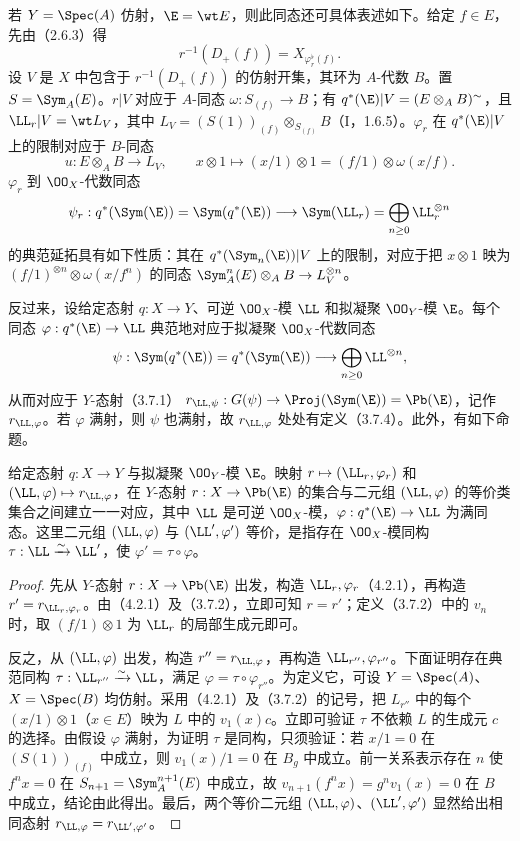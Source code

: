 若 $Y=\Spec(A)$ 仿射，$\E=\wt E$，则此同态还可具体表述如下。给定 $f\in E$，先由（2.6.3）得
\begin{equation}\tag{4.2.1.2}r^{-1}(D_+(f))=X_{\varphi_r^\flat(f)}.\end{equation}
设 $V$ 是 $X$ 中包含于 $r^{-1}(D_+(f))$ 的仿射开集，其环为 $A$-代数 $B$。置 $S=\Sym_A(E)$。$r|V$ 对应于 $A$-同态 $\omega:S_{(f)}\to B$；有 $q^*(\E)|V=(E\otimes_A B)^\sim$，且 $\LL_r|V=\wt L_V$，其中
$L_V=(S(1))_{(f)}\otimes_{S_{(f)}}B$（I，1.6.5）。$\varphi_r$ 在 $q^*(\E)|V$ 上的限制对应于 $B$-同态
\[
u:E\otimes_A B\longrightarrow L_V,\qquad
x\otimes1\longmapsto(x/1)\otimes1=(f/1)\otimes\omega(x/f).
\]
$\varphi_r$ 到 $\OO_X$-代数同态
\[
\psi_r:q^*(\Sym(\E))=\Sym(q^*(\E))\longrightarrow
\Sym(\LL_r)=\bigoplus_{n\geq0}\LL_r^{\otimes n}
\]
的典范延拓具有如下性质：其在 $q^*(\Sym_n(\E))|V$ 上的限制，对应于把 $x\otimes1$ 映为 $(f/1)^{\otimes n}\otimes\omega(x/f^n)$ 的同态
$\Sym_A^n(E)\otimes_A B\to L_V^{\otimes n}$。

反过来，设给定态射 $q:X\to Y$、可逆 $\OO_X$-模 $\LL$ 和拟凝聚 $\OO_Y$-模 $\E$。每个同态 $\varphi:q^*(\E)\to\LL$ 典范地对应于拟凝聚 $\OO_X$-代数同态
\[
\psi:\Sym(q^*(\E))=q^*(\Sym(\E))\longrightarrow\bigoplus_{n\geq0}\LL^{\otimes n},
\]
从而对应于 $Y$-态射（3.7.1）
$r_{\LL,\psi}:G(\psi)\to\Proj(\Sym(\E))=\Pb(\E)$，记作 $r_{\LL,\varphi}$。若 $\varphi$ 满射，则 $\psi$ 也满射，故 $r_{\LL,\varphi}$ 处处有定义（3.7.4）。此外，有如下命题。

给定态射 $q:X\to Y$ 与拟凝聚 $\OO_Y$-模 $\E$。映射
$r\mapsto(\LL_r,\varphi_r)$ 和 $(\LL,\varphi)\mapsto r_{\LL,\varphi}$，在 $Y$-态射 $r:X\to\Pb(\E)$ 的集合与二元组 $(\LL,\varphi)$ 的等价类集合之间建立一一对应，其中 $\LL$ 是可逆 $\OO_X$-模，$\varphi:q^*(\E)\to\LL$ 为满同态。这里二元组 $(\LL,\varphi)$ 与 $(\LL',\varphi')$ 等价，是指存在 $\OO_X$-模同构 $\tau:\LL\xrightarrow{\sim}\LL'$，使 $\varphi'=\tau\circ\varphi$。
\begin{proof}
先从 $Y$-态射 $r:X\to\Pb(\E)$ 出发，构造 $\LL_r,\varphi_r$（4.2.1），再构造 $r'=r_{\LL_r,\varphi_r}$。由（4.2.1）及（3.7.2），立即可知 $r=r'$；定义（3.7.2）中的 $v_n$ 时，取 $(f/1)\otimes1$ 为 $\LL_r$ 的局部生成元即可。

反之，从 $(\LL,\varphi)$ 出发，构造 $r''=r_{\LL,\varphi}$，再构造 $\LL_{r''},\varphi_{r''}$。下面证明存在典范同构 $\tau:\LL_{r''}\xrightarrow{\sim}\LL$，满足 $\varphi=\tau\circ\varphi_{r''}$。为定义它，可设 $Y=\Spec(A)$、$X=\Spec(B)$ 均仿射。采用（4.2.1）及（3.7.2）的记号，把 $L_{r''}$ 中的每个 $(x/1)\otimes1$（$x\in E$）映为 $L$ 中的 $v_1(x)c$。立即可验证 $\tau$ 不依赖 $L$ 的生成元 $c$ 的选择。由假设 $\varphi$ 满射，为证明 $\tau$ 是同构，只须验证：若 $x/1=0$ 在 $(S(1))_{(f)}$ 中成立，则 $v_1(x)/1=0$ 在 $B_g$ 中成立。前一关系表示存在 $n$ 使 $f^nx=0$ 在 $S_{n+1}=\Sym_A^{n+1}(E)$ 中成立，故
$v_{n+1}(f^nx)=g^nv_1(x)=0$ 在 $B$ 中成立，结论由此得出。最后，两个等价二元组 $(\LL,\varphi)$、$(\LL',\varphi')$ 显然给出相同态射 $r_{\LL,\varphi}=r_{\LL',\varphi'}$。
\end{proof}

